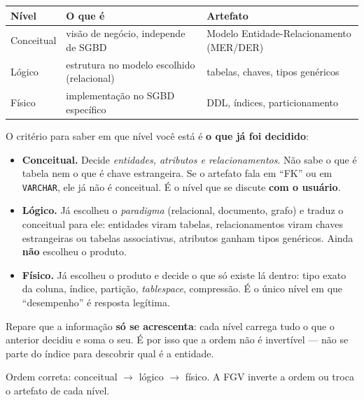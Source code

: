 \begin{center}
\begin{tabular}{@{}p{2.4cm}p{4.6cm}p{4.6cm}@{}}
\toprule
\textbf{Nível} & \textbf{O que é} & \textbf{Artefato} \\
\midrule
Conceitual & visão de negócio, independe de SGBD & Modelo Entidade-Relacionamento (MER/DER) \\
Lógico & estrutura no modelo escolhido (relacional) & tabelas, chaves, tipos genéricos \\
Físico & implementação no SGBD específico & DDL, índices, particionamento \\
\bottomrule
\end{tabular}
\end{center}

\begin{conceito}
O critério para saber em que nível você está é \textbf{o que já foi
decidido}:

\begin{itemize}
\item \textbf{Conceitual.} Decide \emph{entidades, atributos e
relacionamentos}. Não sabe o que é tabela nem o que é chave estrangeira. Se o
artefato fala em ``FK'' ou em \texttt{VARCHAR}, ele já não é conceitual. É o
nível que se discute \textbf{com o usuário}.
\item \textbf{Lógico.} Já escolheu o \emph{paradigma} (relacional, documento,
grafo) e traduz o conceitual para ele: entidades viram tabelas,
relacionamentos viram chaves estrangeiras ou tabelas associativas, atributos
ganham tipos genéricos. Ainda \textbf{não} escolheu o produto.
\item \textbf{Físico.} Já escolheu o produto e decide o que só existe lá
dentro: tipo exato da coluna, índice, partição, \emph{tablespace}, compressão.
É o único nível em que ``desempenho'' é resposta legítima.
\end{itemize}

Repare que a informação \textbf{só se acrescenta}: cada nível carrega tudo o
que o anterior decidiu e soma o seu. É por isso que a ordem não é invertível
--- não se parte do índice para descobrir qual é a entidade.
\end{conceito}

\begin{pegadinha}
Ordem correta: conceitual $\to$ lógico $\to$ físico. A FGV inverte a ordem ou
troca o artefato de cada nível.
\end{pegadinha}

